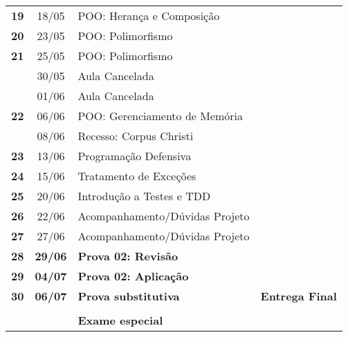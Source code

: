\documentclass[11pt]{article}
\begin{document}
\begin{center}
\begin{tabular}{>{\bfseries}ccl>{\bfseries}c}
19 & 18/05 & POO: Herança e Composição & \\[0pt]
20 & 23/05 & POO: Polimorfismo & \\[0pt]
21 & 25/05 & POO: Polimorfismo & \\[0pt]
\rowcolor{green!40} & 30/05 & Aula Cancelada & \\[0pt]
\rowcolor{green!40} & 01/06 & Aula Cancelada & \\[0pt]
22 & 06/06 & POO: Gerenciamento de Memória & \\[0pt]
\rowcolor{green!40} & 08/06 & Recesso: Corpus Christi & \\[0pt]
23 & 13/06 & Programação Defensiva & \\[0pt]
24 & 15/06 & Tratamento de Exceções & \\[0pt]
25 & 20/06 & Introdução a Testes e TDD & \\[0pt]
26 & 22/06 & Acompanhamento/Dúvidas Projeto & \\[0pt]
27 & 27/06 & Acompanhamento/Dúvidas Projeto & \\[0pt]
\rowcolor{yellow!50} 28 & \textbf{29/06} & \textbf{Prova 02: Revisão} & \\[0pt]
\rowcolor{yellow!50} 29 & \textbf{04/07} & \textbf{Prova 02: Aplicação} & \\[0pt]
\rowcolor{yellow!50} 30 & \textbf{06/07} & \textbf{Prova substitutiva} & Entrega Final\\[0pt]
 &  &  & \\[0pt]
\rowcolor{yellow!50} &  & \textbf{Exame especial} & \\[0pt]
\bottomrule
\end{tabular}
\end{center}
\end{document}

